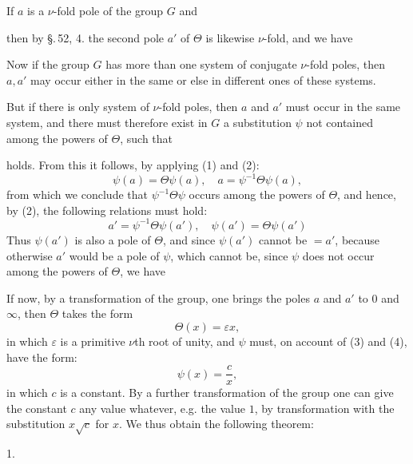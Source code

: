 
If $a$ is a $\nu$-fold pole of the group $G$ and


then by \S.\,52, 4. the second pole $a'$ of $\Theta$ is likewise $\nu$-fold,
and we have


Now if the group $G$ has more than one system of conjugate
$\nu$-fold poles, then $a, a'$ may occur either in the same
or else in different ones of these systems.

But if there is only  system of $\nu$-fold poles, then $a$
and $a'$ must occur in the same system, and there must therefore
exist in $G$ a substitution $\psi$ not contained among the powers of $\Theta$,
such that


holds. From this it follows, by applying (1) and (2):
\[
\psi(a) = \Theta\psi(a), \quad a = \psi^{-1}\Theta\psi(a),
\]
from which we conclude that $\psi^{-1}\Theta\psi$ occurs among the powers of
$\Theta$, and hence, by (2), the following relations must hold:
\[
a' = \psi^{-1}\Theta\psi(a'), \quad \psi(a') = \Theta\psi(a')
\]
Thus $\psi(a')$ is also a pole of $\Theta$, and since $\psi(a')$
cannot be $= a'$, because otherwise $a'$ would be a pole of $\psi$, which
cannot be, since $\psi$ does not occur among the powers of $\Theta$,
we have


If now, by a transformation of the group, one brings the poles
$a$ and $a'$ to $0$ and $\infty$, then $\Theta$ takes the form
\[
\Theta(x) = \varepsilon x,
\]
in which $\varepsilon$ is a primitive $\nu$th root of unity, and $\psi$ must, on account of
(3) and (4), have the form:
\[
\psi(x) = \frac{c}{x},
\]
in which $c$ is a constant. By a further transformation
of the group one can give the constant $c$ any value whatever,
e.g. the value $1$, by transformation with the substitution $x\sqrt{c}$ for $x$.
We thus obtain the following theorem:

1.~
